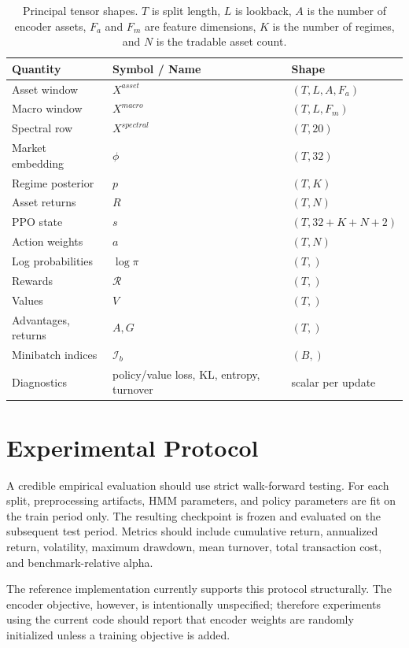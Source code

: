 \documentclass[11pt]{article}
\newcommand{\1}{\mathbf{1}}
\begin{document}
\begin{table}[ht]
\centering
\begin{tabular}{lll}
\toprule
Quantity & Symbol / Name & Shape \\
\midrule
Asset window & $X^{asset}$ & $(T,L,A,F_a)$ \\
Macro window & $X^{macro}$ & $(T,L,F_m)$ \\
Spectral row & $X^{spectral}$ & $(T,20)$ \\
Market embedding & $\phi$ & $(T,32)$ \\
Regime posterior & $p$ & $(T,K)$ \\
Asset returns & $R$ & $(T,N)$ \\
PPO state & $s$ & $(T,32+K+N+2)$ \\
Action weights & $a$ & $(T,N)$ \\
Log probabilities & $\log\pi$ & $(T,)$ \\
Rewards & $\mathcal{R}$ & $(T,)$ \\
Values & $V$ & $(T,)$ \\
Advantages, returns & $A,G$ & $(T,)$ \\
Minibatch indices & $\mathcal{I}_b$ & $(B,)$ \\
Diagnostics & policy/value loss, KL, entropy, turnover & scalar per update \\
\bottomrule
\end{tabular}
\caption{Principal tensor shapes. $T$ is split length, $L$ is lookback, $A$ is
the number of encoder assets, $F_a$ and $F_m$ are feature dimensions, $K$ is the
number of regimes, and $N$ is the tradable asset count.}
\label{tab:shapes}
\end{table}

\section{Experimental Protocol}

A credible empirical evaluation should use strict walk-forward testing. For each
split, preprocessing artifacts, HMM parameters, and policy parameters are fit on
the train period only. The resulting checkpoint is frozen and evaluated on the
subsequent test period. Metrics should include cumulative return, annualized
return, volatility, maximum drawdown, mean turnover, total transaction cost, and
benchmark-relative alpha.

The reference implementation currently supports this protocol structurally. The
encoder objective, however, is intentionally unspecified; therefore experiments
using the current code should report that encoder weights are randomly
initialized unless a training objective is added.
\end{document}
